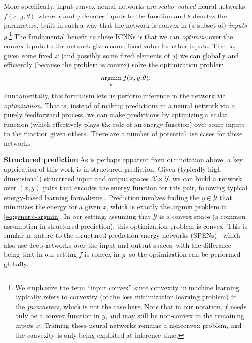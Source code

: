 More specifically, input-convex neural networks are
\emph{scalar-valued} neural networks $f(x, y;\theta)$ where $x$ and
$y$ denotes inputs to the function and $\theta$
denotes the parameters, built in such a way that the network is convex in
(a subset of) \emph{inputs} $y$.\footnote{
We emphasize the term ``input convex''
since convexity in machine learning typically refers to convexity (of the loss
minimization learning problem) in the \emph{parameters}, which is not the case
here.  Note that in our notation, $f$ needs only be a convex function in
$y$, and may still be non-convex in the remaining inputs $x$.  Training these
neural networks remains a nonconvex problem, and the
convexity is only being exploited at inference time.}
The fundamental benefit to these ICNNs is that we can \emph{optimize} over
the convex inputs to the network given some fixed value for other inputs.  That
is, given some fixed $x$ (and possibly some fixed elements of $y$) we can
globally and efficiently (because the problem is convex) solve the optimization
problem
\begin{equation}
\operatorname*{argmin}_{y} f(x, y; \theta).
\label{eq:generic-argmin}
\end{equation}
Fundamentally, this
formalism lets us perform inference in the network via \emph{optimization}.
That is, instead of making predictions in a neural network via a purely
feedforward process, we can make predictions by optimizing a scalar function
(which effectively plays the role of an energy function) over some
inputs to the function given others.  There are a number of potential use cases
for these networks.

\textbf{Structured prediction}  As is perhaps apparent from our
notation above, a key application of this work is in structured prediction.
Given (typically high-dimensional) structured input and output spaces $\mathcal
{X} \times \mathcal{Y}$, we can build a network over $(x,y)$ pairs
that encodes the energy function for this pair, following typical energy-based
learning formalisms \citep{lecun2006tutorial}.  Prediction involves finding the
$y \in \mathcal {Y}$ that
minimizes the energy for a given $x$, which is exactly
the argmin problem in \cref{eq:generic-argmin}.
In our setting, assuming that $\mathcal{Y}$ is a convex space (a common
assumption in structured prediction), this optimization
problem is convex.
This is similar in nature to the structured prediction energy networks (SPENs)
\citep{belanger2016structured}, which also use deep networks over the input and
output spaces, with the difference being that in our setting $f$ is convex in
$y$, so the optimization can be performed globally.

